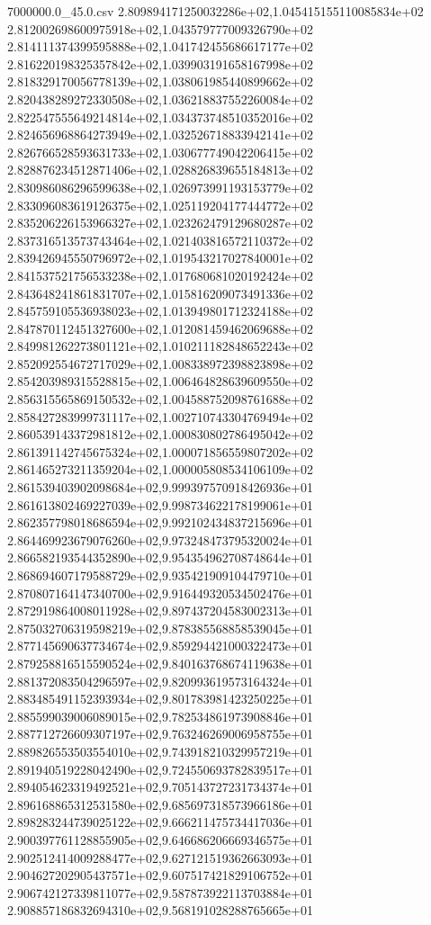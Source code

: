 \begin{filecontents*}{7000000.0_45.0.csv}
2.809894171250032286e+02,1.045415155110085834e+02
2.812002698600975918e+02,1.043579777009326790e+02
2.814111374399595888e+02,1.041742455686617177e+02
2.816220198325357842e+02,1.039903191658167998e+02
2.818329170056778139e+02,1.038061985440899662e+02
2.820438289272330508e+02,1.036218837552260084e+02
2.822547555649214814e+02,1.034373748510352016e+02
2.824656968864273949e+02,1.032526718833942141e+02
2.826766528593631733e+02,1.030677749042206415e+02
2.828876234512871406e+02,1.028826839655184813e+02
2.830986086296599638e+02,1.026973991193153779e+02
2.833096083619126375e+02,1.025119204177444772e+02
2.835206226153966327e+02,1.023262479129680287e+02
2.837316513573743464e+02,1.021403816572110372e+02
2.839426945550796972e+02,1.019543217027840001e+02
2.841537521756533238e+02,1.017680681020192424e+02
2.843648241861831707e+02,1.015816209073491336e+02
2.845759105536938023e+02,1.013949801712324188e+02
2.847870112451327600e+02,1.012081459462069688e+02
2.849981262273801121e+02,1.010211182848652243e+02
2.852092554672717029e+02,1.008338972398823898e+02
2.854203989315528815e+02,1.006464828639609550e+02
2.856315565869150532e+02,1.004588752098761688e+02
2.858427283999731117e+02,1.002710743304769494e+02
2.860539143372981812e+02,1.000830802786495042e+02
2.861391142745675324e+02,1.000071856559807202e+02
2.861465273211359204e+02,1.000005808534106109e+02
2.861539403902098684e+02,9.999397570918426936e+01
2.861613802469227039e+02,9.998734622178199061e+01
2.862357798018686594e+02,9.992102434837215696e+01
2.864469923679076260e+02,9.973248473795320024e+01
2.866582193544352890e+02,9.954354962708748644e+01
2.868694607179588729e+02,9.935421909104479710e+01
2.870807164147340700e+02,9.916449320534502476e+01
2.872919864008011928e+02,9.897437204583002313e+01
2.875032706319598219e+02,9.878385568858539045e+01
2.877145690637734674e+02,9.859294421000322473e+01
2.879258816515590524e+02,9.840163768674119638e+01
2.881372083504296597e+02,9.820993619573164324e+01
2.883485491152393934e+02,9.801783981423250225e+01
2.885599039006089015e+02,9.782534861973908846e+01
2.887712726609307197e+02,9.763246269006958755e+01
2.889826553503554010e+02,9.743918210329957219e+01
2.891940519228042490e+02,9.724550693782839517e+01
2.894054623319492521e+02,9.705143727231734374e+01
2.896168865312531580e+02,9.685697318573966186e+01
2.898283244739025122e+02,9.666211475734417036e+01
2.900397761128855905e+02,9.646686206669346575e+01
2.902512414009288477e+02,9.627121519362663093e+01
2.904627202905437571e+02,9.607517421829106752e+01
2.906742127339811077e+02,9.587873922113703884e+01
2.908857186832694310e+02,9.568191028288765665e+01

\end{filecontents*}
